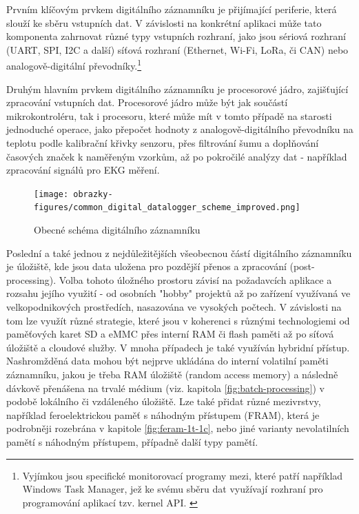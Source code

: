 Prvním klíčovým prvkem digitálního záznamníku je přijímající periferie, která slouží ke sběru vstupních dat. V závislosti na konkrétní aplikaci může tato komponenta zahrnovat různé typy vstupních rozhraní, jako jsou sériová rozhraní (UART, SPI, I2C a další) síťová rozhraní (Ethernet, Wi-Fi, LoRa, či CAN) nebo analogově-digitální převodníky.\footnote{Vyjímkou jsou specifické monitorovací programy mezi, které patří například Windows Task Manager, jež ke svému sběru dat využívají rozhraní pro programování aplikací tzv. kernel API. \cite{fourcore_win_process_birth}} \cite{ieee_digital_sound_recorder_arm_sd_card}


Druhým hlavním prvkem digitálního záznamníku je procesorové jádro, zajišťující zpracování vstupních dat. Procesorové jádro může být jak součástí mikrokontroléru, tak i procesoru, které může mít v tomto případě na starosti jednoduché operace, jako přepočet hodnoty z analogově-digitálního převodníku na teplotu podle kalibrační křivky senzoru, přes filtrování šumu a doplňování časových značek k naměřeným vzorkům, až po pokročilé analýzy dat - například zpracování signálů pro EKG měření. \cite{springer_development_ECG_recorder}

\begin{figure}[h]
    \centering
    \texttt{[image: obrazky-figures/common\_digital\_datalogger\_scheme\_improved.png]}
    \caption{Obecné schéma digitálního záznamníku}
    \label{fig:common-digital-datalogger}
\end{figure}

Poslední a také jednou z nejdůležitějších všeobecnou částí digitálního záznamníku je úložiště, kde jsou data uložena pro pozdější přenos a zpracování (post-processing). Volba tohoto úložného prostoru závisí na požadavcích aplikace a rozsahu jejího využití - od osobních "hobby" projektů až po zařízení využívaná ve velkopodnikových prostředích, nasazována ve vysokých počtech. V závislosti na tom lze využít různé strategie, které jsou v koherenci s různými technologiemi od paměťových karet SD a eMMC přes interní RAM či flash paměti až po síťová úložiště a cloudové služby. V mnoha případech je také využíván hybridní přístup. Nashromžděná data mohou být nejprve ukládána do interní volatilní paměti záznamníku, jakou je třeba RAM úložiště (random access memory) a následně dávkově přenášena na trvalé médium (viz. kapitola \ref{fig:batch-processing}) v podobě lokálního či vzdáleného úložiště. Lze také přidat různé mezivrstvy, například feroelektrickou paměť s náhodným přístupem (FRAM), která je podrobněji rozebrána v kapitole \ref{fig:feram-1t-1c}, nebo jiné varianty nevolatilních pamětí s náhodným přístupem, případně další typy pamětí. \cite{rta_local_vs_cloud} 

